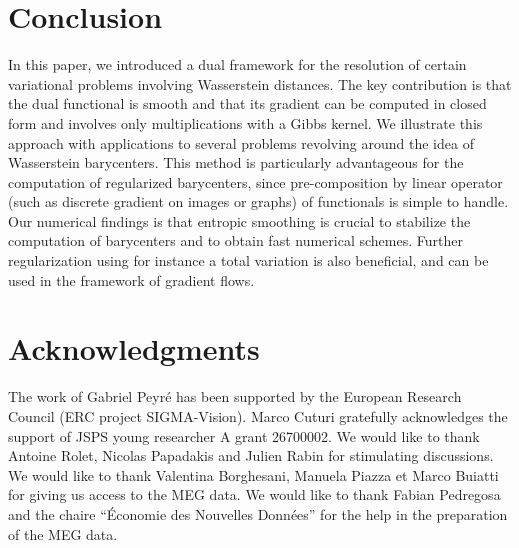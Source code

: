 
\section*{Conclusion}

In this paper, we introduced a dual framework for the resolution of certain variational problems involving Wasserstein distances. The key contribution is that the dual functional is smooth and that its gradient can be computed in closed form and involves only multiplications with a Gibbs kernel. 
%
We illustrate this approach with applications to several problems revolving around the idea of Wasserstein barycenters. This method is particularly advantageous for the computation of regularized barycenters, since pre-composition by linear operator  (such as discrete gradient on images or graphs) of functionals is simple to handle. 
% 
Our numerical findings is that entropic smoothing is crucial to stabilize the computation of barycenters and to obtain fast numerical schemes. 
%
Further regularization using for instance a total variation is also beneficial, and can be used in the framework of gradient flows.



\section*{Acknowledgments}

The work of Gabriel Peyr\'e has been supported by the European Research Council (ERC project SIGMA-Vision).
%
Marco Cuturi gratefully acknowledges the support of JSPS young researcher A grant 26700002.
%
We would like to thank Antoine Rolet, Nicolas Papadakis and Julien Rabin for stimulating discussions. 
%
We would like to thank Valentina Borghesani, Manuela Piazza et Marco Buiatti for giving us access to the MEG data.
% 
We would like to thank Fabian Pedregosa and the chaire ``\'Economie des Nouvelles Donn\'ees'' for the help in the preparation of the MEG data.
